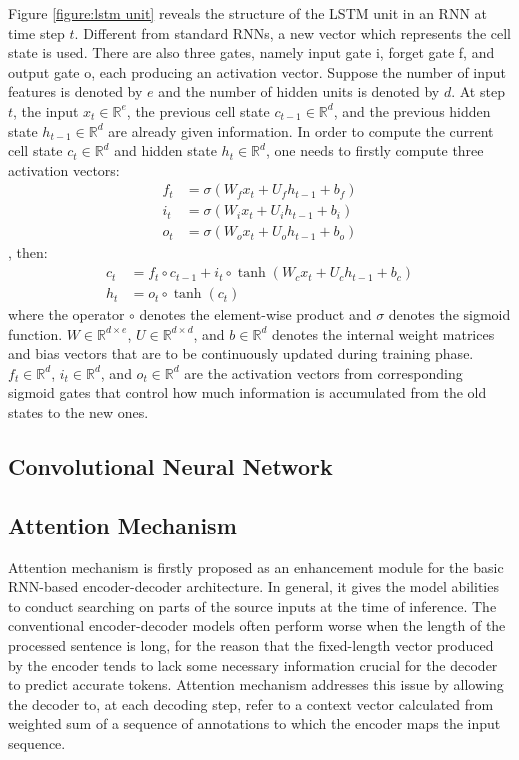 Figure \ref{figure:lstm unit} reveals the structure of the LSTM unit in an RNN at time step $ t $. Different from standard RNNs, a new vector which represents the cell state is used. There are also three gates, namely input gate i, forget gate f, and output gate o, each producing an activation vector. Suppose the number of input features is denoted by $ e $ and the number of hidden units is denoted by $ d $. At step $ t $, the input $ x_{t} \in \mathbb{R}^{e} $, the previous cell state $ c_{t-1} \in \mathbb{R}^{d} $, and the previous hidden state $ h_{t-1} \in \mathbb{R}^{d} $ are already given information. In order to compute the current cell state $ c_{t} \in \mathbb{R}^{d} $ and hidden state $ h_{t} \in \mathbb{R}^{d} $, one needs to firstly compute three activation vectors:
\begin{align*}
f_{t} &= \sigma(W_{f}x_{t}+U_{f}h_{t-1}+b_{f}) \\
i_{t} &= \sigma(W_{i}x_{t}+U_{i}h_{t-1}+b_{i}) \\
o_{t} &= \sigma(W_{o}x_{t}+U_{o}h_{t-1}+b_{o})
\end{align*}
, then:
\begin{align*}
c_{t} &= f_{t}\circ c_{t-1}+i_{t}\circ \tanh(W_{c}x_{t}+U_{c}h_{t-1}+b_{c}) \\
h_{t} &= o_{t}\circ \tanh(c_{t})
\end{align*}
where the operator $ \circ $ denotes the element-wise product and $ \sigma $ denotes the sigmoid function. $ W \in \mathbb{R}^{d\times e} $, $ U \in \mathbb{R}^{d \times d} $, and $ b \in \mathbb{R}^{d} $ denotes the internal weight matrices and bias vectors that are to be continuously updated during training phase. $ f_{t} \in \mathbb{R}^{d} $, $ i_{t} \in \mathbb{R}^{d} $, and $ o_{t} \in \mathbb{R}^{d} $ are the activation vectors from corresponding sigmoid gates that control how much information is accumulated from the old states to the new ones.

\subsection{Convolutional Neural Network} \label{subsection:cnn}

\subsection{Attention Mechanism} \label{subsection:attention}

Attention mechanism \cite{Bahdanau2014} is firstly proposed as an enhancement module for the basic RNN-based encoder-decoder architecture. In general, it gives the model abilities to conduct searching on parts of the source inputs at the time of inference. The conventional encoder-decoder models often perform worse when the length of the processed sentence is long, for the reason that the fixed-length vector produced by the encoder tends to lack some necessary information crucial for the decoder to predict accurate tokens. Attention mechanism addresses this issue by allowing the decoder to, at each decoding step, refer to a context vector calculated from weighted sum of a sequence of annotations to which the encoder maps the input sequence.

